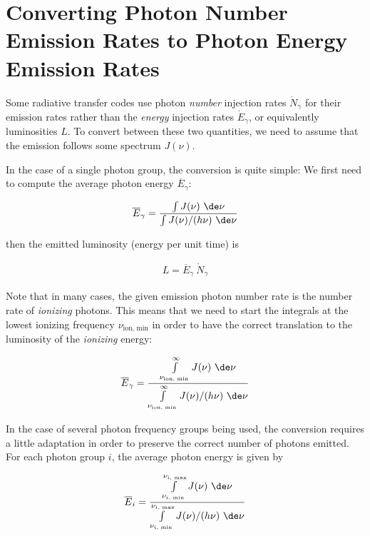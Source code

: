 \chapter{Converting Photon Number Emission Rates to Photon Energy Emission 
Rates}\label{app:number-to-luminosity}

Some radiative transfer codes use photon \emph{number} injection rates $\dot{N}_{\gamma}$ for their 
emission rates rather than the \emph{energy} injection rates $\dot{E}_\gamma$, or equivalently 
luminosities $L$. To convert between these two quantities, we need to assume that the emission 
follows some spectrum $J(\nu)$.

In the case of a single photon group, the conversion is quite simple: We first need to compute the 
average photon energy $\overline{E}_\gamma$:

\begin{align}
	\overline{E}_\gamma = \frac{\int J(\nu) \ \de \nu }{\int J(\nu) / (h \nu) \ \de \nu}
\end{align}

then the emitted luminosity (energy per unit time) is

\begin{align}
	L = \overline{E}_\gamma \ \dot{N}_{\gamma}
\end{align}

Note that in many cases, the given emission photon number rate is the number rate of \emph{ionizing} 
photons. This means that we need to start the integrals at the lowest ionizing frequency 
$\nu_{\text{ion, min}}$ in order to have the correct translation to the luminosity of the 
\emph{ionizing} energy:


\begin{align}
	\overline{E}_\gamma = \frac{\int\limits_{\nu_{\text{ion, min}}}^\infty J(\nu) \ \de \nu 
}{\int\limits_{\nu_{\text{ion, min}}}^\infty J(\nu) / (h \nu) \ \de \nu}
\end{align}


In the case of several photon frequency groups being used, the conversion requires a little 
adaptation in order to preserve the correct number of photons emitted. For each photon group $i$, 
the average photon energy is given by

\begin{align}
	\overline{E}_i = \frac{\int\limits_{\nu_{i \text{, min}}}^{\nu_{i \text{, max}}} J(\nu) \ \de 
\nu }{\int\limits_{\nu_{i \text{, min}}}^{\nu_{i \text{, max}}} J(\nu) / (h \nu) \ \de \nu}
\end{align}


